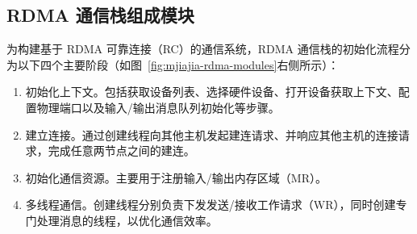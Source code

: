 {    %







    \subsection{RDMA 通信栈组成模块}

    为构建基于 RDMA 可靠连接（RC）的通信系统，RDMA 通信栈的初始化流程分为以下四个主要阶段（如图~\ref{fig:mjiajia-rdma-modules}右侧所示）：
    \begin{enumerate}[label=\arabic*.]
        \item 初始化上下文。包括获取设备列表、选择硬件设备、打开设备获取上下文、配置物理端口以及输入/输出消息队列初始化等步骤。
        \item 建立连接。通过创建线程向其他主机发起建连请求、并响应其他主机的连接请求，完成任意两节点之间的建连。
        \item 初始化通信资源。主要用于注册输入/输出内存区域（MR）。
        \item 多线程通信。创建线程分别负责下发发送/接收工作请求（WR），同时创建专门处理消息的线程，以优化通信效率。
    \end{enumerate}

}

